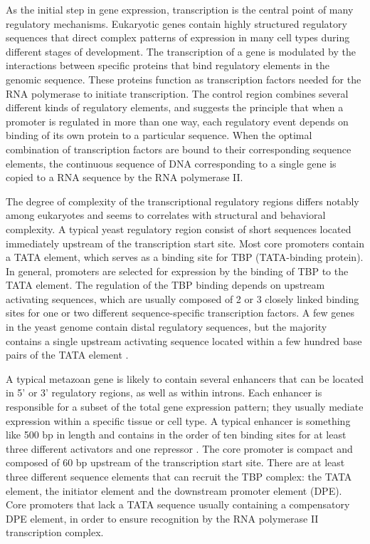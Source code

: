 As the initial step in gene expression, transcription is the central
point of many regulatory mechanisms. Eukaryotic genes contain highly
structured regulatory sequences that direct complex patterns of
expression in many cell types during different stages of development.
The transcription of a gene is modulated by the interactions between
specific proteins that bind regulatory elements in the genomic
sequence. These proteins function as transcription factors needed for
the RNA polymerase to initiate transcription. The control region
combines several different kinds of regulatory elements, and suggests
the principle that when a promoter is regulated in more than one way,
each regulatory event depends on binding of its own protein to a
particular sequence.  When the optimal combination of transcription
factors are bound to their corresponding sequence elements, the
continuous sequence of DNA corresponding to a single gene is copied to
a RNA sequence by the RNA polymerase II.

The degree of complexity of the transcriptional regulatory regions
differs notably among eukaryotes and seems to correlates with
structural and behavioral complexity. A typical yeast regulatory
region consist of short sequences located immediately upstream of the
transcription start site. Most core promoters contain a TATA element,
which serves as a binding site for TBP (TATA-binding protein). In
general, promoters are selected for expression by the binding of TBP to
the TATA element. The regulation of the TBP binding depends on
upstream activating sequences, which are usually composed of 2 or 3
closely linked binding sites for one or two different sequence-specific
transcription factors. A few genes in the yeast genome contain distal
regulatory sequences, but the majority contains a single upstream
activating sequence located within a few hundred base pairs of the
TATA element \citep{levine:2003a}.

A typical metazoan gene is likely to contain several enhancers that
can be located in 5' or 3' regulatory regions, as well as within
introns. Each enhancer is responsible for a subset of the total gene
expression pattern; they usually mediate expression within a specific
tissue or cell type. A typical enhancer is something like 500 bp in
length and contains in the order of ten binding sites for at least
three different activators and one repressor \citep{levine:2003a}. The
core promoter is compact and composed of 60 bp upstream of the
transcription start site. There are at least three different sequence
elements that can recruit the TBP 
complex: the TATA element, the initiator element and the downstream
promoter element (DPE). Core promoters that lack a TATA sequence
usually containing a compensatory DPE element, in order to ensure
recognition by the RNA polymerase II transcription complex.

